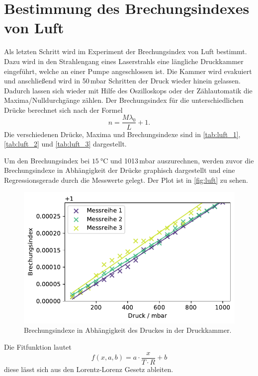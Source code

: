 \section{Bestimmung des Brechungsindexes von Luft}
Als letzten Schritt wird im Experiment der Brechungsindex von Luft bestimmt.
Dazu wird in den Strahlengang eines Laserstrahls eine längliche Druckkammer eingeführt, welche an einer
Pumpe angeschlossen ist. Die Kammer wird evakuiert und anschließend wird in 50\,mbar Schritten der Druck
wieder hinein gelassen.
Dadurch lassen sich wieder mit Hilfe des Oszilloskops oder der Zählautomatik die Maxima/Nulldurchgänge zählen.
Der Brechungsindex für die unterschiedlichen Drücke berechnet sich nach der Formel
\begin{equation*}
	n = \frac{M \lambda_{0}}{L} +1.
	\label{eqn:brechungsindex_gas}
\end{equation*}
Die verschiedenen Drücke, Maxima und Brechungsindexe sind in \autoref{tab:luft_1},\autoref{tab:luft_2} und \autoref{tab:luft_3}
dargestellt.



\FloatBarrier
Um den Brechungsindex bei $\SI{15}{\celsius}$ und 1013\,mbar auszurechnen, werden zuvor die Brechungsindexe
in Abhängigkeit der Drücke graphisch dargestellt und eine Regressionsgerade durch die Messwerte gelegt.
Der Plot ist in \autoref{fig:luft} zu sehen.
\begin{figure}
    \centering
    \includegraphics[width=0.8\linewidth]{Plots/Brechungsindex.pdf}
    \caption{Brechungsindexe in Abhängigkeit des Druckes in der Druckkammer.}
    \label{fig:luft}
\end{figure}
\FloatBarrier
Die Fitfunktion lautet 
\begin{equation}
    f(x, a, b) = a \cdot \frac{x}{T \cdot R} + b
    \label{eqn:fit}
\end{equation}
diese lässt sich aus den Lorentz-Lorenz Gesetz ableiten.
